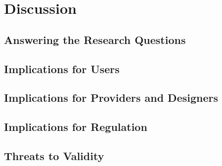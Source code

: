 \chapter{Discussion}
\label{ch:discussion}

\section{Answering the Research Questions}

\section{Implications for Users}

\section{Implications for Providers and Designers}

\section{Implications for Regulation}

\section{Threats to Validity}
